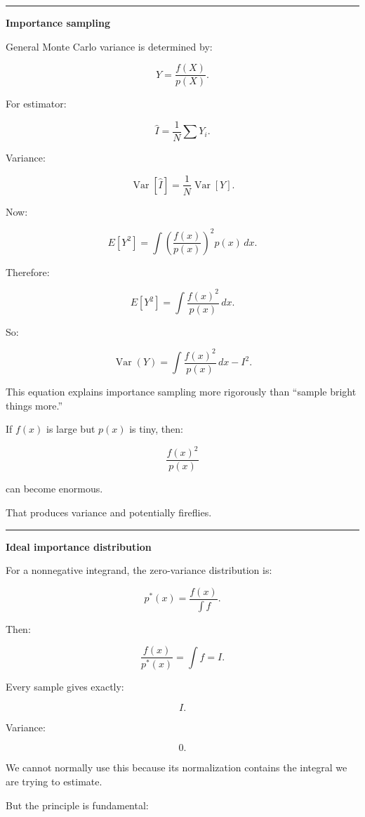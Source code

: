 \begin{center}\rule{0.5\linewidth}{0.5pt}\end{center}

\textbf{Importance sampling}

General Monte Carlo variance is determined by:

\[
Y=
\frac{f(X)}{p(X)}.
\]

For estimator:

\[
\hat I=\frac1N\sum Y_i.
\]

Variance:

\[
\operatorname{Var}[\hat I]
=
\frac{1}{N}
\operatorname{Var}[Y].
\]

Now:

\[
E[Y^2]
=
\int
\left(
\frac{f(x)}{p(x)}
\right)^2
p(x)\,dx.
\]

Therefore:

\[
E[Y^2]
=
\boxed{
\int
\frac{f(x)^2}{p(x)}
\,dx.
}
\]

So:

\[
\boxed{
\operatorname{Var}(Y)
=
\int
\frac{f(x)^2}{p(x)}
\,dx
-
I^2.
}
\]

This equation explains importance sampling more rigorously than ``sample bright things more.''

If \(f(x)\) is large but \(p(x)\) is tiny, then:

\[
\frac{f(x)^2}{p(x)}
\]

can become enormous.

That produces variance and potentially fireflies.

\begin{center}\rule{0.5\linewidth}{0.5pt}\end{center}

\textbf{Ideal importance distribution}

For a nonnegative integrand, the zero-variance distribution is:

\[
\boxed{
p^*(x)
=
\frac{
f(x)
}{
\int f
}.
}
\]

Then:

\[
\frac{f(x)}{p^*(x)}
=
\int f
=
I.
\]

Every sample gives exactly:

\[
I.
\]

Variance:

\[
0.
\]

We cannot normally use this because its normalization contains the integral we are trying to estimate.

But the principle is fundamental:

